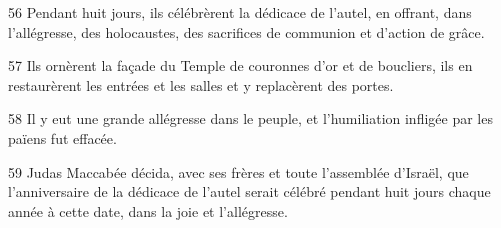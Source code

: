 
56 Pendant huit jours, ils célébrèrent la dédicace de l’autel, en offrant, dans l’allégresse, des holocaustes, des sacrifices de communion et d’action de grâce.

57 Ils ornèrent la façade du Temple de couronnes d’or et de boucliers, ils en restaurèrent les entrées et les salles et y replacèrent des portes.

58 Il y eut une grande allégresse dans le peuple, et l’humiliation infligée par les païens fut effacée.

59 Judas Maccabée décida, avec ses frères et toute l’assemblée d’Israël, que l’anniversaire de la dédicace de l’autel serait célébré pendant huit jours chaque année à cette date, dans la joie et l’allégresse.
